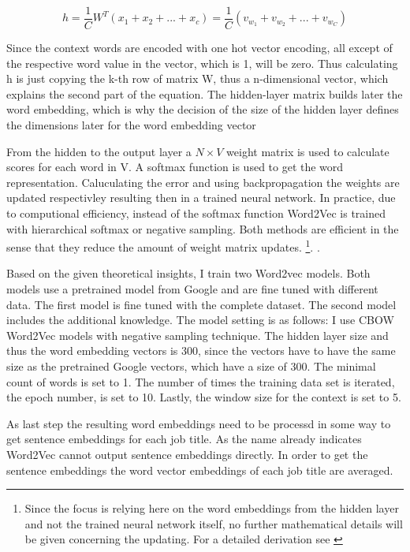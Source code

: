 \documentclass[12pt, a4paper, titlepage]{article}
\begin{document}
\[ h = \frac{1}{C} W^T(x_1 + x_2 + ... +x_c) = \frac{1}{C}(v_{w_1} + v_{w_2} + ... + v_{w_C}) \]

Since the context words are encoded with one hot vector encoding, all except of the respective word value in the vector, which is 1, will be zero. Thus calculating h is just copying the k-th row of matrix W, thus a n-dimensional vector, which explains the second part of the equation. The hidden-layer matrix builds later the word embedding, which is why the decision of the size of the hidden layer defines the dimensions later for the word embedding vector \citep{rong2014}

From the hidden to the output layer a $N \times V$ weight matrix is used to calculate scores for each word in V. A softmax function is used to get the word representation. Caluculating the error and using backpropagation the weights are updated respectivley resulting then in a trained neural network. In practice, due to computional efficiency, instead of the softmax function Word2Vec is trained with hierarchical softmax or negative sampling. Both methods are efficient in the sense that they reduce the amount of weight matrix updates. \footnote{Since the focus is relying here on the word embeddings from the hidden layer and not the trained neural network itself, no further mathematical details will be given concerning the updating. For a detailed derivation see \citep{rong2014}}. \citep{rong2014, simonton2017}. 

Based on the given theoretical insights, I train two Word2vec models. Both models use a pretrained model from Google and are fine tuned with different data. The first model is fine tuned with the complete dataset. The second model includes the additional knowledge. The model setting is as follows: I use \ac{CBOW} Word2Vec models with negative sampling technique. The hidden layer size and thus the word embedding vectors is 300, since the vectors have to have the same size as the pretrained Google vectors, which have a size of 300. The minimal count of words is set to 1. The number of times the training data set is iterated, the epoch number, is set to 10. Lastly, the window size for the context is set to 5. 

As last step the resulting word embeddings need to be processd in some way to get sentence embeddings for each job title. As the name already indicates Word2Vec cannot output sentence embeddings directly. In order to get the sentence embeddings the word vector embeddings of each job title are averaged. 
\end{document}
